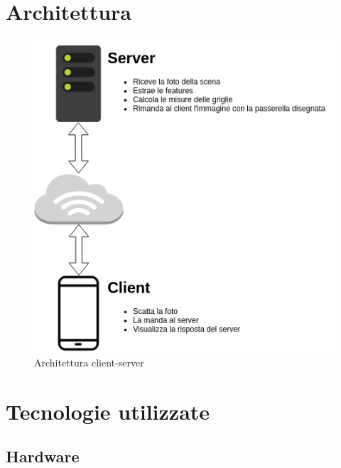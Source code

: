 \documentclass[twoside]{supsistudent}
\begin{document}
\section{Architettura}
\begin{figure}[H]
  \center
  \includegraphics[scale=0.6]{images/Architettura.png}
  \caption{Architettura client-server}
\end{figure}

\section{Tecnologie utilizzate}
\subsection{Hardware}
\end{document}

